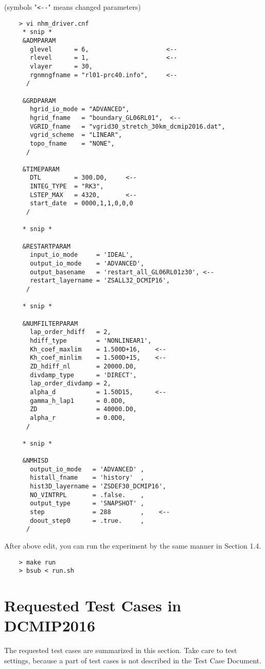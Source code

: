 \documentclass[a4paper]{article}
\begin{document}
 \noindent (symbols "\verb|<--|" means changed parameters)
 \begin{verbatim}
    > vi nhm_driver.cnf
     * snip *
     &ADMPARAM
       glevel      = 6,                     <--
       rlevel      = 1,                     <--
       vlayer      = 30,
       rgnmngfname = "rl01-prc40.info",     <--
      /

     &GRDPARAM
       hgrid_io_mode = "ADVANCED",
       hgrid_fname   = "boundary_GL06RL01",  <--
       VGRID_fname   = "vgrid30_stretch_30km_dcmip2016.dat",
       vgrid_scheme  = "LINEAR",
       topo_fname    = "NONE",
      /

     &TIMEPARAM
       DTL         = 300.D0,     <--
       INTEG_TYPE  = "RK3",
       LSTEP_MAX   = 4320,       <--
       start_date  = 0000,1,1,0,0,0
      /

     * snip *

     &RESTARTPARAM
       input_io_mode     = 'IDEAL',
       output_io_mode    = 'ADVANCED',
       output_basename   = 'restart_all_GL06RL01z30', <--
       restart_layername = 'ZSALL32_DCMIP16',
      /

     * snip *

     &NUMFILTERPARAM
       lap_order_hdiff   = 2,
       hdiff_type        = 'NONLINEAR1',
       Kh_coef_maxlim    = 1.500D+16,    <--
       Kh_coef_minlim    = 1.500D+15,    <--
       ZD_hdiff_nl       = 20000.D0,
       divdamp_type      = 'DIRECT',
       lap_order_divdamp = 2,
       alpha_d           = 1.50D15,      <--
       gamma_h_lap1      = 0.0D0,
       ZD                = 40000.D0,
       alpha_r           = 0.0D0,
      /

     * snip *

     &NMHISD
       output_io_mode   = 'ADVANCED' ,
       histall_fname    = 'history'  ,
       hist3D_layername = 'ZSDEF30_DCMIP16',
       NO_VINTRPL       = .false.    ,
       output_type      = 'SNAPSHOT' ,
       step             = 288        ,    <--
       doout_step0      = .true.     ,
      /
 \end{verbatim}

 \noindent After above edit, you can run the experiment
 by the same manner in Section 1.4.
 \begin{verbatim}
    > make run
    > bsub < run.sh
 \end{verbatim}


\clearpage

\section{Requested Test Cases in DCMIP2016}
 The requested test cases are summarized in this section.
 Take care to test settings, because a part of test cases is not described
 in the Test Case Document.
\end{document}
